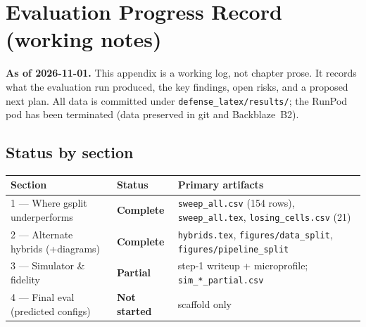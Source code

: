 \chapter*{Evaluation Progress Record (working notes)}

\noindent\textbf{As of 2026-11-01.} This appendix is a working log, not chapter prose.
It records what the evaluation run produced, the key findings, open risks, and a
proposed next plan. All data is committed under \texttt{defense\_latex/results/}; the
RunPod pod has been terminated (data preserved in git and Backblaze~B2).

\section*{Status by section}
\begin{table}[h]
\centering\small
\begin{tabular}{l l l}
\toprule
Section & Status & Primary artifacts \\
\midrule
1 — Where gsplit underperforms & \textbf{Complete} & \texttt{sweep\_all.csv} (154 rows), \texttt{sweep\_all.tex}, \texttt{losing\_cells.csv} (21) \\
2 — Alternate hybrids (+diagrams) & \textbf{Complete} & \texttt{hybrids.tex}, \texttt{figures/data\_split}, \texttt{figures/pipeline\_split} \\
3 — Simulator \& fidelity & \textbf{Partial} & step-1 writeup + microprofile; \texttt{sim\_*\_partial.csv} \\
4 — Final eval (predicted configs) & \textbf{Not started} & scaffold only \\
\bottomrule
\end{tabular}
\end{table}

